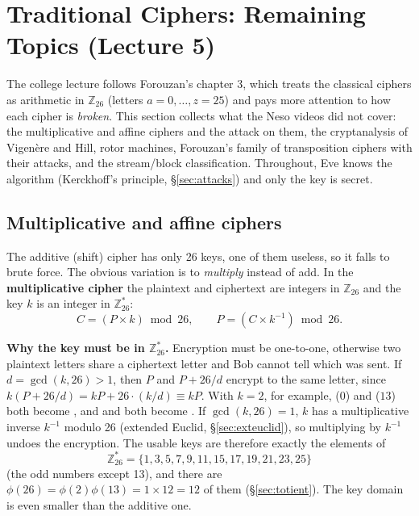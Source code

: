 \section{Traditional Ciphers: Remaining Topics (Lecture 5)}\label{sec:classextra}
The college lecture follows Forouzan's chapter 3, which treats the classical ciphers as arithmetic in $\mathbb{Z}_{26}$ (letters $a = 0, \dots, z = 25$) and pays more attention to how each cipher is \emph{broken}. This section collects what the Neso videos did not cover: the multiplicative and affine ciphers and the attack on them, the cryptanalysis of Vigen\`ere and Hill, rotor machines, Forouzan's family of transposition ciphers with their attacks, and the stream/block classification. Throughout, Eve knows the algorithm (Kerckhoff's principle, \S\ref{sec:attacks}) and only the key is secret.

\subsection{Multiplicative and affine ciphers \hot}
The additive (shift) cipher has only 26 keys, one of them useless, so it falls to brute force. The obvious variation is to \emph{multiply} instead of add. In the \textbf{multiplicative cipher} the plaintext and ciphertext are integers in $\mathbb{Z}_{26}$ and the key $k$ is an integer in $\mathbb{Z}_{26}^*$:
\[
C = (P \times k) \bmod 26, \qquad P = (C \times k^{-1}) \bmod 26 .
\]

\textbf{Why the key must be in $\mathbb{Z}_{26}^*$.} Encryption must be one-to-one, otherwise two plaintext letters share a ciphertext letter and Bob cannot tell which was sent. If $d = \gcd(k, 26) > 1$, then $P$ and $P + 26/d$ encrypt to the same letter, since $k(P + 26/d) = kP + 26 \cdot (k/d) \equiv kP$. With $k = 2$, for example,  ($0$) and  ($13$) both become , and  and  both become . If $\gcd(k, 26) = 1$, $k$ has a multiplicative inverse $k^{-1}$ modulo 26 (extended Euclid, \S\ref{sec:exteuclid}), so multiplying by $k^{-1}$ undoes the encryption. The usable keys are therefore exactly the elements of
\[
\mathbb{Z}_{26}^* = \{1, 3, 5, 7, 9, 11, 15, 17, 19, 21, 23, 25\}
\]
(the odd numbers except 13), and there are $\phi(26) = \phi(2)\phi(13) = 1 \times 12 = 12$ of them (\S\ref{sec:totient}). The key domain is even smaller than the additive one.


